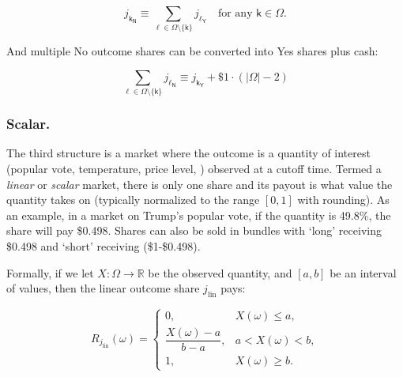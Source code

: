 \begin{equation}
j_{\mathsf{k_N}} \equiv \sum_{\ell \in \Omega\setminus\{\mathsf{k}\}} j_{\mathsf{\ell_Y}} \quad\text{for any }\mathsf{k}\in\Omega.
\end{equation}

And multiple No outcome shares can be converted into Yes shares plus cash:

\begin{equation}
\sum_{\ell \in \Omega\setminus\{\mathsf{k}\}} j_{\mathsf{\ell_N}}
\equiv
j_{\mathsf{k_Y}} + \$1\cdot(|\Omega|-2)
\end{equation}




\subsubsection{Scalar.}

The third structure is a market where the outcome is a quantity of interest (\eg popular vote, temperature, price level, \etc) observed at a cutoff time. Termed a \textit{linear} or \textit{scalar} market, there is only one share and its payout is what value the quantity takes on (typically normalized to the range $[0,1]$ with rounding). As an example, in a market on Trump's popular vote, if the quantity is 49.8\%, the share will pay \$0.498. Shares can also be sold in bundles with `long' receiving \$0.498 and `short' receiving (\$1-\$0.498).

Formally, if we let $X:\Omega\to\mathbb{R}$ be the observed quantity, and $[a,b]$ be an interval of values, then the linear outcome share $j_{\mathrm{lin}}$ pays:

\begin{equation}
R_{j_{\mathrm{lin}}}(\omega)=
\begin{cases}
0, & X(\omega)\le a,\\
\dfrac{X(\omega)-a}{\,b-a\,}, & a< X(\omega) < b,\\
1, & X(\omega)\ge b.
\end{cases}
\end{equation}


